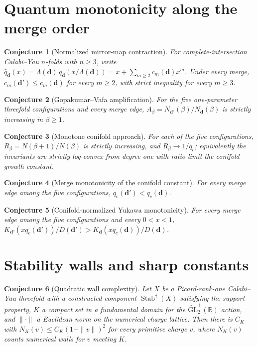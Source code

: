 \documentclass[11pt]{article}
\newtheorem{conjecture}{Conjecture}
\theoremstyle{definition}
\begin{document}
\section{Quantum monotonicity along the merge order}

\begin{conjecture}[Normalized mirror-map contraction]\label{ad5}
For complete-intersection Calabi--Yau $n$-folds with $n\ge3$, write $\hat q_{\mathbf d}(x)=\Lambda(\mathbf d)\,q_{\mathbf d}(x/\Lambda(\mathbf d))=x+\sum_{m\ge2}c_m(\mathbf d)x^m$.  Under every merge, $c_m(\mathbf d')\le c_m(\mathbf d)$ for every $m\ge2$, with strict inequality for every $m\ge3$.
\end{conjecture}

\begin{conjecture}[Gopakumar--Vafa amplification]\label{ad6}
For the five one-parameter threefold configurations and every merge edge, $A_\beta=N_{\mathbf d'}(\beta)/N_{\mathbf d}(\beta)$ is strictly increasing in $\beta\ge1$.
\end{conjecture}

\begin{conjecture}[Monotone conifold approach]\label{ad7}
For each of the five configurations, $R_\beta=N(\beta+1)/N(\beta)$ is strictly increasing, and $R_\beta\to1/q_c$; equivalently the invariants are strictly log-convex from degree one with ratio limit the conifold growth constant.
\end{conjecture}

\begin{conjecture}[Merge monotonicity of the conifold constant]\label{ad8}
For every merge edge among the five configurations, $q_c(\mathbf d')<q_c(\mathbf d)$.
\end{conjecture}

\begin{conjecture}[Conifold-normalized Yukawa monotonicity]\label{ad9}
For every merge edge among the five configurations and every $0<x<1$, $K_{\mathbf d'}(xq_c(\mathbf d'))/D(\mathbf d')>K_{\mathbf d}(xq_c(\mathbf d))/D(\mathbf d)$.
\end{conjecture}

\section{Stability walls and sharp constants}

\begin{conjecture}[Quadratic wall complexity]\label{ad10}
Let $X$ be a Picard-rank-one Calabi--Yau threefold with a constructed component $\operatorname{Stab}^\dagger(X)$ satisfying the support property, $K$ a compact set in a fundamental domain for the $\widetilde{\mathrm{GL}}_2^+(\mathbb R)$ action, and $\|\cdot\|$ a Euclidean norm on the numerical charge lattice.  Then there is $C_K$ with $N_K(v)\le C_K(1+\|v\|)^2$ for every primitive charge $v$, where $N_K(v)$ counts numerical walls for $v$ meeting $K$.
\end{conjecture}
\end{document}
